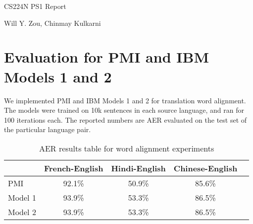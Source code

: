 \documentclass[10pt]{article}
\begin{document}
\centerline{\sc \huge CS224N PS1 Report } %
\vspace{.5pc}
\centerline{\sc Will Y. Zou, Chinmay Kulkarni} %
\centerline{\sc}
\vspace{3pc}
\setlength\parindent{0in}
\section{Evaluation for PMI and IBM Models 1 and 2}
We implemented PMI and IBM Models 1 and 2 for translation word alignment. The models were trained on 10k sentences in each source language, and ran for 100 iterations each. The reported numbers are AER evaluated on the test set of the particular language pair. 
\begin{table}[bht]
\centering
\begin{small}
\caption{AER results table for word alignment experiments}
\label{tab:summary}
\begin{tabular}{|l|c|c|c|c|}
\hline
                       & \bf{French-English} & \bf{Hindi-English} & \bf{Chinese-English} \\
\hline
PMI & 92.1\%   & 50.9\%                &   85.6\%      \\
\hline
Model 1          & 93.9\%   & 53.3\%          &   86.5\%   \\
\hline
Model 2          & 93.9\%   & 53.3\%          &   86.5\%   \\
\hline
\end{tabular}
\end{small}
\end{table}
\end{document}
